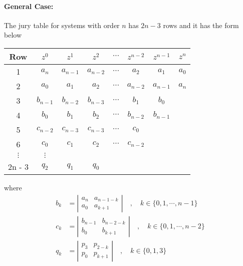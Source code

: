\documentclass[twoside]{article}
\begin{document}
\paragraph{General Case:} 
%
The jury table for systems with order $n$ has $2n - 3$
rows and it has the form below
%
\begin{center}
  \begin{tabular}{ | c || c c c c c c c|}
    \hline
    Row & $z^0$ & $z^1$ & $z^2$ & $\cdots$ & $z^{n-2}$ & $z^{n-1}$ & $z^n$ \\ \hline \hline
    1 & $a_n$ & $a_{n-1}$ & $a_{n-2}$ & $\cdots$ & $a_2$ & $a_1$ & $a_0$ \\ \hline
    2 & $a_0$ & $a_1$ & $a_2$ & $\cdots$ & $a_{n-2}$ & $a_{n-1}$ & $a_{n}$ \\ \hline
    3 & $b_{n-1}$ & $b_{n-2}$ & $b_{n-3}$ & $\cdots$ & $b_1$ & $b_0$ &
                                                                        \\ \hline
    4 & $b_0$ & $b_1$ & $b_2$ & $\cdots$ & $b_{n-2}$ & $b_{n-1}$ & \\
    \hline
    5 & $c_{n-2}$ & $c_{n-3}$ & $c_{n-3}$ & $\cdots$ & $c_0$ &  &  \\ \hline
    6 & $c_0$ & $c_1$ & $c_2$ & $\cdots$ & $c_{n-2}$ &  & \\ \hline
$\vdots$ & $\vdots$ & & & & &  & \\ \hline
    2n - 3 & $q_2$ & $q_1$ & $q_0$ & & & &  \\ \hline
  \end{tabular}
\end{center}
%
where
%
\begin{align*}
  b_{k} &= \left| \begin{array}{cc} a_n & a_{n-1-k} \\ a_0 &
       a_{k+1} \end{array} \right| \quad , \quad  k \in \lbrace 0,1,
                                                            \cdots,
                                                            n-1
                                                            \rbrace
\\
  c_{k} &= \left| \begin{array}{cc} b_{n-1} & b_{n-2-k} \\ b_0 &
       b_{k+1} \end{array} \right| \quad , \quad  k \in \lbrace 0,1,
                                                            \cdots,
                                                            n-2
                                                            \rbrace
\\
  q_{k} &= \left| \begin{array}{cc} p_3 & p_{2-k} \\ p_0 &
       p_{k+1} \end{array} \right| \quad , \quad  k \in \lbrace 0,1,3 \rbrace
\end{align*}
\end{document}
